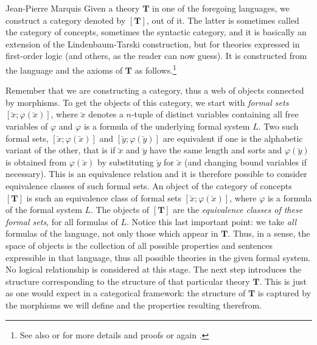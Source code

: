 \begin{artengenv}{Jean-Pierre Marquis}
Given a  theory \( \mathbf{T} \) in one of the foregoing languages, we construct a category denoted by \( [\mathbf{T}] \), out of it.  The latter is sometimes called the category of concepts, sometimes the syntactic category, and it is basically an extension of the Lindenbaum-Tarski construction, but for theories expressed in first-order logic (and others, as the reader can now guess). It is constructed from the language and the axioms of \( \mathbf{T} \) as follows.\footnote{See also \parencite[][chap.~8]{MakkaiReyes1977} or \parencite[][chap.~X, \S~5]{MacLane1994} for more details and proofs or again \parencite{Johnstone2002}.} 


Remember that we are constructing a category, thus a web of objects connected by morphisms. To get the objects of this category, we start with \textit{formal sets} \( [\lvec{x}; \varphi(\lvec{x})] \), where \( \lvec{x} \) denotes a \( n \)-tuple of distinct variables containing all free variables of \( \varphi \) and \( \varphi \) is a formula of the underlying formal system \( L \). Two such formal sets, \( [\lvec{x}; \varphi(\lvec{x})] \) and \( [\lvec{y}; \varphi(\lvec{y})] \) are equivalent if one is the alphabetic variant of the other, that is if \( \lvec{x} \) and \( \lvec{y} \) have the same length and sorts and \( \varphi(\lvec{y}) \) is obtained from \( \varphi(\lvec{x}) \) by substituting \( \lvec{y} \) for \( \lvec{x} \) (and changing bound variables if necessary). This is an equivalence relation and it is therefore possible to consider equivalence classes of such formal sets. An object of the category of concepts \( [\mathbf{T}] \) is such an equivalence class of formal sets \( [\lvec{x}; \varphi(\lvec{x})] \), where \( \varphi \) is a formula of the formal system \( L \). The objects of \( [\mathbf{T}] \) are the \emph{equivalence classes of these formal sets}, for all formulas of \( L \). Notice this last important point: we take \textit{all} formulas of the language, not only those which appear in \( \mathbf{T} \). Thus, in a sense, the space of objects is the collection of all possible properties and sentences expressible in that language, thus all possible theories in the given formal system. No logical relationship is considered at this stage. The next step introduces the structure corresponding to the structure of that particular theory \( \mathbf{T} \). This is just as one would expect in a categorical framework: the structure of \( \mathbf{T} \) is captured by the morphisms we will define and the properties resulting therefrom.


\end{artengenv}
